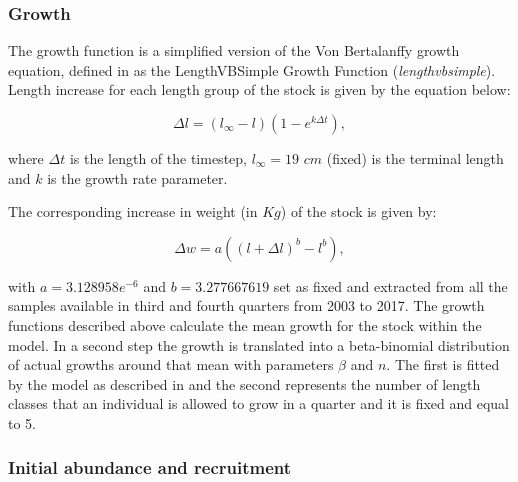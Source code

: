 \documentclass[review]{elsarticle}
\begin{document}

\subsubsection*{Growth}
The growth function is a simplified version of the Von Bertalanffy growth equation, defined in \citet{begley_gadget_2004} as the LengthVBSimple Growth Function (\textit{lengthvbsimple}).
Length increase for each length group of the stock is given by the equation below:

\begin{equation}
\label{eq:inlen}
\Delta l =(l_\infty - l)(1-e^{k\Delta t}),
\end{equation}

where $\Delta t$ is the length of the timestep, $l_\infty=19$ $cm$ (fixed) is the terminal length and $k$ is the growth rate parameter.

The corresponding increase in weight (in $Kg$) of the stock is given by:

\begin{equation}
\label{eq:inwei}
\Delta w=a ((l + \Delta l)^b - l^b),
\end{equation}

with $a=3.128958e^{-6}$ and  $b=3.277667619$ set as fixed and extracted from all the samples available in third and fourth quarters from 2003 to 2017.
The growth functions described above calculate the mean growth for the stock within the model. In a second step the growth is translated into a beta-binomial distribution of actual growths around that mean with parameters $\beta$ and $n$. The first is fitted by the model as described in  \citet{taylor_simple_2007} and the second represents the number of length classes that an individual is allowed to grow in a quarter and it is fixed and equal to 5.%



\subsubsection*{Initial abundance and recruitment}
\end{document}
